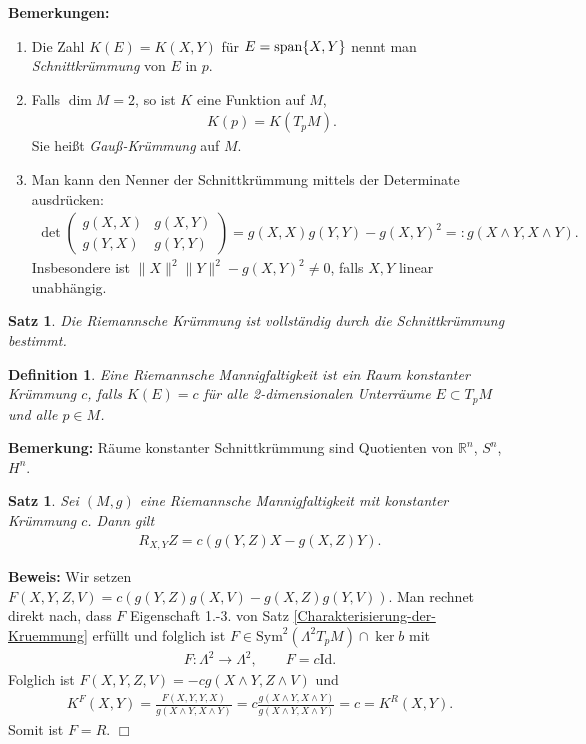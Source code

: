 \documentclass[12pt,a4paper]{article}
\def\R{\mathbb{R}}
\def\Sym{\mathrm{Sym}}
\def\Id{\mathrm{Id}}
\newtheorem{Satz}[Lemma]{Satz}
\newtheorem{Definition}[Lemma]{Definition}
\def\proof{\noindent\textbf{Beweis:}\quad}
\def\qed{\quad\hfill\ensuremath{\Box}}
\begin{document}
{\bf Bemerkungen:}
\begin{enumerate}
  \item Die Zahl $K(E) = K(X,Y)$ f\"ur $E = \mathrm{span}\{X,Y\}$ nennt man
  \emph{Schnittkr\"ummung} von $E$ in $p$.
  \item Falls $\dim M=2$, so ist $K$ eine Funktion auf $M$,
  \begin{align*}
  K(p) = K(T_pM).
  \end{align*}
  Sie hei\ss{}t \emph{Gau\ss{}-Kr\"ummung} auf $M$.
  \item Man kann den Nenner der Schnittkr\"ummung mittels der Determinate
  ausdr\"ucken:
  \begin{align*}
  \det
  \left(\begin{smallmatrix}
  g(X,X) & g(X,Y)\\
  g(Y,X) & g(Y,Y)
  \end{smallmatrix}\right)
  =
  g(X,X)g(Y,Y) - g(X,Y)^2 =: g(X\wedge Y,X\wedge Y). 
  \end{align*}
  Insbesondere ist $\|X\|^2\|Y\|^2 - g(X,Y)^2\neq 0$, falls $X,Y$ linear
  unabh\"angig.
\end{enumerate}

\bigskip

\begin{Satz}
Die Riemannsche Kr\"ummung ist vollst\"andig durch die Schnittkr\"ummung bestimmt.
\end{Satz}

\bigskip

\begin{Definition}
Eine Riemannsche Mannigfaltigkeit ist ein \emph{Raum konstanter Kr\"ummung} $c$,
falls $K(E) = c$ f\"ur alle 2-dimensionalen Unterr\"aume $E\subset T_pM$ und
alle $p\in M$.
\end{Definition}

\bigskip

{\bf Bemerkung:}
R\"aume konstanter Schnittkr\"ummung sind Quotienten von $\R^n$, $S^n$, $H^n$.

\bigskip

\begin{Satz}
Sei $(M,g)$ eine Riemannsche Mannigfaltigkeit mit konstanter Kr\"ummung $c$. Dann
gilt
\begin{align*}
R_{X,Y}Z = c\left(g(Y,Z)X - g(X,Z)Y \right).
\end{align*}
\end{Satz}

\proof
Wir setzen $F(X,Y,Z,V) = c\left(g(Y,Z)g(X,V) - g(X,Z)g(Y,V) \right)$. Man
rechnet direkt nach, dass $F$ Eigenschaft 1.-3. von Satz
\ref{Charakterisierung-der-Kruemmung} erf\"ullt und folglich ist $F\in \Sym^2(\Lambda^2T_pM)\cap \ker b$ mit
\begin{align*}
F: \Lambda^2\to \Lambda^2,\qquad F = c\Id.
\end{align*}
Folglich ist $F(X,Y,Z,V) = -cg(X\wedge Y,Z\wedge V)$ und
\begin{align*}
K^F(X,Y) = \frac{F(X,Y,Y,X)}{g(X\wedge Y,X\wedge Y)} = 
c\frac{g(X\wedge Y,X\wedge Y)}{g(X\wedge Y,X\wedge Y)} = c = K^R(X,Y).
\end{align*}
Somit ist $F=R$.
\qed
\end{document}
